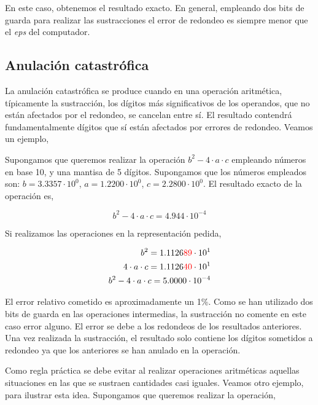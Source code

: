 \begin{paracol}{2}
En este caso, obtenemos el resultado exacto. En general, empleando dos bits de guarda para realizar las sustracciones el error de redondeo es siempre menor que el \emph{eps} del computador.


\subsection{Anulación catastrófica}
La anulación catastrófica se produce cuando en una operación aritmética, típicamente la sustracción,  los dígitos más significativos de los operandos, que no están afectados por el redondeo, se cancelan entre sí. El resultado contendrá fundamentalmente dígitos que sí están afectados por errores de redondeo. Veamos un ejemplo,

Supongamos que queremos realizar la operación $b^2-4\cdot a \cdot c$ empleando números en base 10, y una mantisa de 5 dígitos. Supongamos que los números empleados son: $b= 3.3357\cdot10^0$, $a=1.2200\cdot10^0$, $c=2.2800\cdot10^0$. El resultado exacto de la operación es,
\end{paracol}
\begin{equation}
b^2-4\cdot a\cdot c=4.944\cdot10^{-4}
\end{equation}

\begin{paracol}{2}
Si realizamos las operaciones en la representación pedida,
\end{paracol}
\begin{align*}
b^2=1.1126{\color{red}89}\cdot10^1\\
4\cdot a\cdot c=1.1126{\color{red}40}\cdot10^1\\
b^2-4\cdot a\cdot c=5.0000\cdot10^{-4}
\end{align*}
\begin{paracol}{2}
El error relativo cometido es aproximadamente un 1\%. Como se han utilizado dos bits de guarda en las operaciones intermedias, la sustracción no comente en este caso error alguno. El error se debe a los redondeos de los resultados anteriores. Una vez realizada la sustracción, el resultado solo contiene los dígitos sometidos a redondeo ya que los anteriores se han anulado en la operación.

Como regla práctica se debe evitar al realizar operaciones aritméticas aquellas situaciones en las que se sustraen cantidades casi iguales. Veamos otro ejemplo, para ilustrar esta idea. Supongamos que queremos realizar la operación,
\end{paracol}

